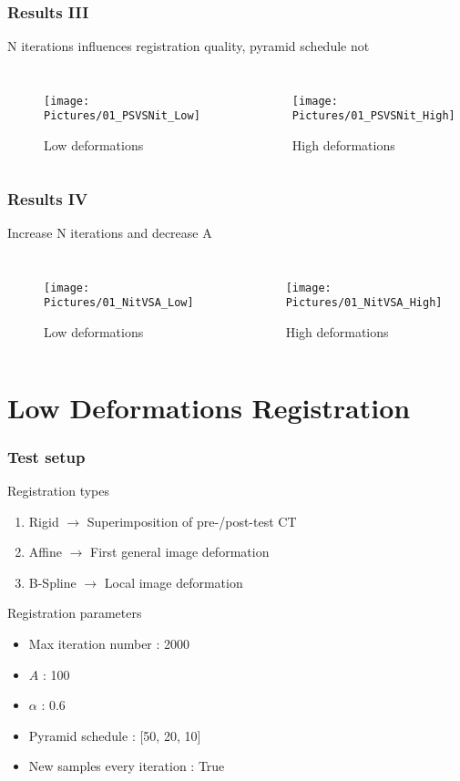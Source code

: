 \documentclass[xcolor=table]{beamer}
\begin{document}
\begin{frame}
	\frametitle{Results III}
	N iterations influences registration quality, pyramid schedule not
	\begin{columns}
		\centering
		\begin{figure}
			\texttt{[image: Pictures/01\_PSVSNit\_Low]}
			\caption{Low deformations}
		\end{figure}
		\centering
		\begin{figure}
			\texttt{[image: Pictures/01\_PSVSNit\_High]}
			\caption{High deformations}
		\end{figure}
	\end{columns}
\end{frame}


\begin{frame}
	\frametitle{Results IV}
	Increase N iterations and decrease A
	\begin{columns}
		\column[c]{0.45\linewidth}
		\centering
		\begin{figure}
			\texttt{[image: Pictures/01\_NitVSA\_Low]}
			\caption{Low deformations}
		\end{figure}
		\column[c]{0.45\linewidth}
		\centering
		\begin{figure}
			\texttt{[image: Pictures/01\_NitVSA\_High]}
			\caption{High deformations}
		\end{figure}
	\end{columns}
\end{frame}






\section{Low Deformations Registration}

\begin{frame}
	\frametitle{Test setup}
	Registration types
	\begin{enumerate}
		\item Rigid $\rightarrow$ Superimposition of pre-/post-test \si{\micro}CT
		\item Affine $\rightarrow$ First general image deformation
		\item B-Spline $\rightarrow$ Local image deformation
	\end{enumerate}
	\vfill
	Registration parameters
	\begin{itemize}
		\item Max iteration number : 2000
		\item $A$ : 100
		\item $\alpha$ : 0.6
		\item Pyramid schedule : [50, 20, 10]
		\item New samples every iteration : True
	\end{itemize}
\end{frame}
\end{document}

